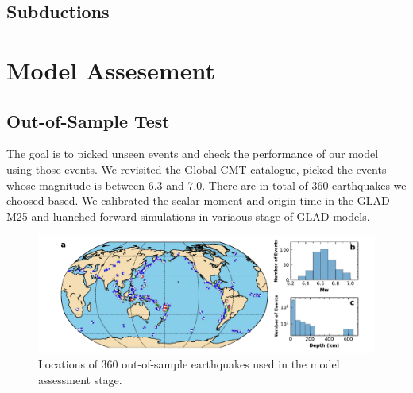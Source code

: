 \documentclass[extra,mreferee]{gji}
\begin{document}

\subsection{Subductions}

\section{Model Assesement}

\subsection{Out-of-Sample Test}

The goal is to picked unseen events and check the performance of our model using those events. We revisited the Global CMT catalogue, picked the events whose magnitude is between 6.3 and 7.0. There are in total of 360 earthquakes we choosed based. We calibrated the scalar moment and origin time in the GLAD-M25 and luanched forward simulations in variaous stage of GLAD models. 

\begin{figure}
\includegraphics[width=\textwidth]{figures/events_360.pdf}
\caption{Locations of 360 out-of-sample earthquakes used in the model assessment stage.}
\centering
\end{figure}
\end{document}
